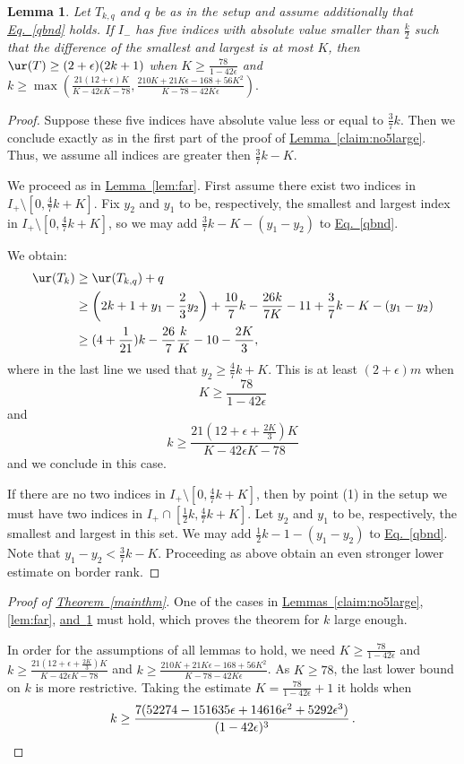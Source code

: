 \documentclass[11pt]{article}
\newcommand{\expref}[2]{\texorpdfstring{\hyperref[#2]{#1~\ref{#2}}}{#1~\ref{#2}}}
\newcommand{\expeqref}[2]{\texorpdfstring{\hyperref[#2]{#1~\eqref{#2}}}{#1~\eqref{#2}}}
\newtheorem{lemma}[theorem]{Lemma}
\begin{document}
\begin{lemma} \label{lem:near}
 Let $T_{k,q}$ and $q$ be as in the setup and assume
additionally that \expeqref{Eq.}{qbnd} holds.
If  $I_{-}$ has five  indices with absolute value smaller than $\frac{k}{2}$
such that the difference of the smallest and largest is at most $K$, 
then
$\ur(T)\geq (2+\epsilon)(2k+1)$ when
$
K\geq \frac{78}{1-42\epsilon}
$
and
$
k\geq \max(\frac{21(12+ \epsilon)K}{K-42\epsilon K-78},\frac{210K+21K\epsilon-168+56K^2}{K-78-42K\epsilon}).
$
\end{lemma}
\begin{proof}
Suppose these five indices have absolute value less or equal to $\frac{3}{7}k$. Then we conclude exactly as in the first part of the proof of \expref{Lemma}{claim:no5large}. Thus, we assume all indices are greater then $\frac{3}{7}k-K$.

We proceed as in \expref{Lemma}{lem:far}. First assume there exist two indices in $I_{+}\setminus [0,\frac{4}{7}k+K]$. Fix $y_2$ and $y_1$ to be, respectively, %
the smallest and largest index in $I_{+}\setminus [0,\frac{4}{7}k+K]$,
so we may add $\frac{3}7k-K-(y_1-y_2)$ to \expeqref{Eq.}{qbnd}.

We obtain:
\begin{align*}
\ur(T_k)&\geq \ur(T_{k,q})+q\\
&\geq \left(2k+1+y_1-\frac 23 y_2\right)+ \frac{10}{7}k-\frac{26k}{7K}-11+\frac 37 k-K-(y_1-y_2)\\
&\geq (4+\frac 1{21})k-\frac{26}{7}\frac kK -10-\frac{2K}{3},
\end{align*}
where in the last line we used that $y_2\geq \frac 47k+K$.
This is at least $(2+\epsilon)m$ when
$$
K\geq \frac{78}{1-42\epsilon}
$$
and
$$
k\geq \frac{21(12+ \epsilon+\frac{2K}{3})K}{K-42\epsilon K-78}
$$
and we conclude in this case.

If there are no two indices in $I_{+}\setminus [0,\frac{4}{7}k+K]$, then by point (1) in the setup we must have two indices in $I_{+}\cap [\frac{1}{2}k, \frac{4}{7}k+K]$. Let $y_2$ and $y_1$ to be, respectively, %
the smallest and largest in this set.
We may add $\frac{1}{2}k-1-(y_1-y_2)$ to \expeqref{Eq.}{qbnd}. Note that $y_1-y_2<\frac{3}{7}k-K$. Proceeding as above obtain an even stronger lower estimate on border rank.
\end{proof}
\begin{proof}[Proof of \expref{Theorem}{mainthm}]
One of the cases in \expref{Lemmas}{claim:no5large},
%
\ref{lem:far}, \expref{and}{lem:near} must hold, 
which proves the theorem for $k$ large enough.

In order for
the  %
assumptions of all lemmas to hold,  we need $K\geq \frac{78}{1-42\epsilon}$ and
$k\geq \frac{21(12+ \epsilon+\frac{2K}{3})K}{K-42\epsilon K-78}$
 and $k\geq \frac{210K+21K\epsilon-168+56K^2}{K-78-42K\epsilon}$.
As $K\geq 78$, the last lower bound on $k$ is more restrictive.  
Taking the estimate $K=\frac{78}{1-42\epsilon}+1$ 
 it holds when
 \[k\geq \frac{7 (52274 - 151635 \epsilon + 14616 \epsilon^2 + 5292 \epsilon^3)}{(1 - 42 \epsilon)^3 }\,.  \qedhere \] 
 \end{proof}
\end{document}
